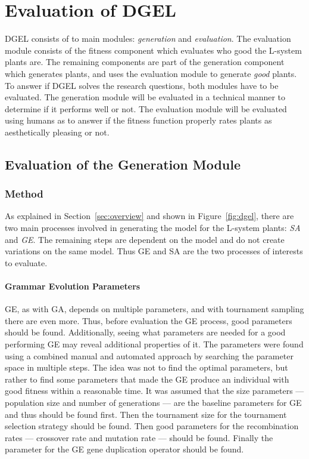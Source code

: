 \chapter{Evaluation of DGEL}
DGEL consists of to main modules: \textit{generation} and \textit{evaluation}.
The evaluation module consists of the fitness component which evaluates who good the L-system plants are.
The remaining components are part of the generation component which generates plants, and uses the evaluation module to generate \textit{good} plants.
To answer if DGEL solves the research questions, both modules have to be evaluated.
The generation module will be evaluated in a technical manner to determine if it performs well or not.
The evaluation module will be evaluated using humans as to answer if the fitness function properly rates plants as aesthetically pleasing or not.

\section{Evaluation of the Generation Module}
\subsection{Method}
As explained in Section~\ref{sec:overview} and shown in Figure~\ref{fig:dgel}, there are two main processes involved in generating the model for the L-system plants: \textit{SA} and \textit{GE}.
The remaining steps are dependent on the model and do not create variations on the same model.
Thus GE and SA are the two processes of interests to evaluate.


\subsubsection{Grammar Evolution Parameters}
GE, as with GA, depends on multiple parameters, and with tournament sampling there are even more.
Thus, before evaluation the GE process, good parameters should be found.
Additionally, seeing what parameters are needed for a good performing GE may reveal additional properties of it.
The parameters were found using a combined manual and automated approach by searching the parameter space in multiple steps.
The idea was not to find the optimal parameters, but rather to find some parameters that made the GE produce an individual with good fitness within a reasonable time.
It was assumed that the size parameters --- population size and number of generations --- are the baseline parameters for GE and thus should be found first.
Then the tournament size for the tournament selection strategy should be found.
Then good parameters for the recombination rates --- crossover rate and mutation rate --- should be found.
Finally the parameter for the GE gene duplication operator should be found.

